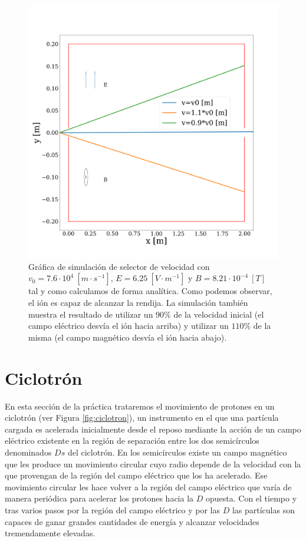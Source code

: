 \documentclass[journal]{IEEEtran}
\begin{document}
\begin{figure}[!htb]
    \includegraphics[width=\linewidth]{selector_simulacion}
    \caption{Gráfica de simulación de selector de velocidad con $v_0 = 7.6\cdot 10^4~[m\cdot s^{-1}]$, $E = 6.25~[V\cdot m^{-1}]$ y $B = 8.21\cdot 10^{-4}~[T]$ tal y como calculamos de forma analítica. Como podemos observar, el ión es capaz de alcanzar la rendija. La simulación también muestra el resultado de utilizar un $90\%$ de la velocidad inicial (el campo eléctrico desvía el ión hacia arriba) y utilizar un $110\%$ de la misma (el campo magnético desvía el ión hacia abajo).}
    \label{fig:selector_simulacion}
\end{figure}

\clearpage

\section{Ciclotrón}
\label{sec:ciclotron}

En esta sección de la práctica trataremos el movimiento de protones en un ciclotrón (ver Figura \ref{fig:ciclotron}), un instrumento en el que una partícula cargada es acelerada inicialmente desde el reposo mediante la acción de un campo eléctrico existente en la región de separación entre los dos semicírculos denominados $Ds$ del ciclotrón. En los semicírculos existe un campo magnético que les produce un movimiento circular cuyo radio depende de la velocidad con la que provengan de la región del campo eléctrico que los ha acelerado. Ese movimiento circular les hace volver a la región del campo eléctrico que varía de manera periódica para acelerar los protones hacia la $D$ opuesta. Con el tiempo y tras varios pasos por la región del campo eléctrico y por las $D$ las partículas son capaces de ganar grandes cantidades de energía y alcanzar velocidades tremendamente elevadas.
\end{document}
